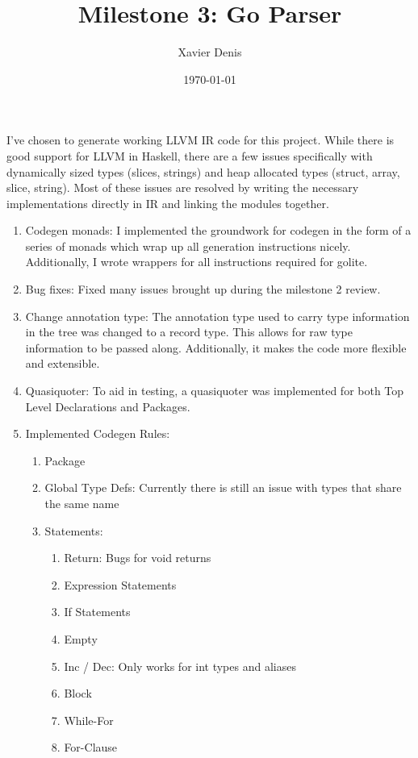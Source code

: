 \documentclass[11pt]{article}
\begin{document}

\title{Milestone 3: Go Parser}
\author{Xavier Denis}
\date{\today}
\maketitle

I've chosen to generate working LLVM IR code for this project. While there is good support for LLVM in Haskell, there are a few issues specifically with dynamically sized types (slices, strings) and heap allocated types (struct, array, slice, string). Most of these issues are resolved by writing the necessary implementations directly in IR and linking the modules together. 

\begin{enumerate}
\item Codegen monads: I implemented the groundwork for codegen in the form of a series of monads which wrap up all generation instructions nicely. Additionally, I wrote wrappers for all instructions required for golite. 
\item Bug fixes: Fixed many issues brought up during the milestone 2 review.
\item Change annotation type: The annotation type used to carry type information in the tree was changed to a record type. This allows for raw type information to be passed along. Additionally, it makes the code more flexible and extensible. 
\item Quasiquoter: To aid in testing, a quasiquoter was implemented for both Top Level Declarations and Packages.
\item Implemented Codegen Rules: \begin{enumerate}
  \item Package
  \item Global Type Defs: Currently there is still an issue with types that share the same name
  \item Statements: \begin{enumerate}
    \item Return: Bugs for void returns
    \item Expression Statements
    \item If Statements
    \item Empty
    \item Inc / Dec: Only works for int types and aliases
    \item Block
    \item While-For
    \item For-Clause

\end{enumerate}
\end{enumerate}
\end{enumerate}
\end{document}
